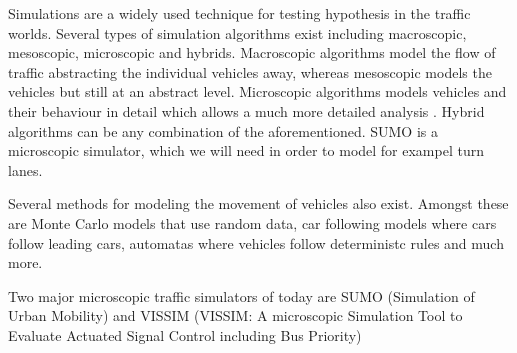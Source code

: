 Simulations are a widely used technique for testing hypothesis in the traffic worlds.
Several types of simulation algorithms exist including macroscopic, mesoscopic, microscopic and hybrids.
Macroscopic algorithms model the flow of traffic abstracting the individual vehicles away, whereas mesoscopic models the vehicles but still at an abstract level. 
Microscopic algorithms models vehicles and their behaviour in detail which allows a much more detailed analysis \cite{meso-micro}. 
Hybrid algorithms can be any combination of the aforementioned.
SUMO is a microscopic simulator, which we will need in order to model for exampel turn lanes.


Several methods for modeling the movement of vehicles also exist.  %
Amongst these are Monte Carlo models \cite{} that use random data, car following models \cite{} where cars follow leading cars, automatas where vehicles follow deterministc rules \cite{} and much more.

Two major microscopic traffic simulators of today are SUMO (Simulation of Urban Mobility)\cite{sumo} and VISSIM (VISSIM: A microscopic Simulation Tool to Evaluate Actuated Signal Control including Bus Priority)








